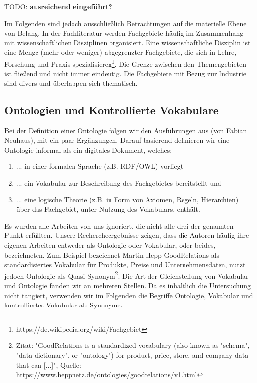 \documentclass{article}
\begin{document}
TODO: \textbf{ausreichend eingeführt?}

Im Folgenden sind jedoch ausschließlich Betrachtungen auf die materielle Ebene von Belang.
In der Fachliteratur werden Fachgebiete häufig im Zusammenhang mit wissenschaftlichen Disziplinen organisiert. Eine wissenschaftliche Disziplin ist eine Menge (mehr oder weniger) abgegrenzter Fachgebiete, die sich in Lehre, Forschung und Praxis spezialisieren\footnote{https://de.wikipedia.org/wiki/Fachgebiet}. Die Grenze zwischen den Themengebieten ist fließend und nicht immer eindeutig.
Die Fachgebiete mit Bezug zur Industrie sind divers und überlappen sich thematisch.

\subsection{Ontologien und Kontrollierte Vokabulare}

Bei der Definition einer Ontologie folgen wir den Ausführungen aus \cite{neuhaus2018ontology} (von Fabian Neuhaus), mit ein paar Ergänzungen. Darauf basierend definieren wir eine Ontologie informal als ein digitales Dokument, welches:

\begin{enumerate}
    \item ... in einer formalen Sprache (z.B. RDF/OWL) vorliegt,
    \item ... ein Vokabular zur Beschreibung des Fachgebietes bereitstellt und
    \item ... eine logische Theorie (z.B. in Form von Axiomen, Regeln, Hierarchien) über das Fachgebiet, unter Nutzung des Vokabulars, enthält.
\end{enumerate}

Es wurden alle Arbeiten von uns ignoriert, die nicht alle drei der genannten Punkt erfüllten.
Unsere Rechercheergebnisse zeigen, dass die Autoren häufig ihre eigenen Arbeiten entweder als Ontologie oder Vokabular, oder beides, bezeichneten.
Zum Beispiel bezeichnet Martin Hepp GoodRelations als standardisiertes Vokabular für Produkte, Preise und Unternehmensdaten, nutzt jedoch Ontologie als Quasi-Synonym\footnote{Zitat: "GoodRelations is a standardized vocabulary (also known as "schema", "data dictionary", or "ontology") for product, price, store, and company data that can [...]", Quelle: \url{https://www.heppnetz.de/ontologies/goodrelations/v1.html}}.
Die Art der Gleichstellung von Vokabular und Ontologie fanden wir an mehreren Stellen.
Da es inhaltlich die Untersuchung nicht tangiert, verwenden wir im Folgenden die Begriffe Ontologie, Vokabular und kontrolliertes Vokabular als Synonyme.
\end{document}
